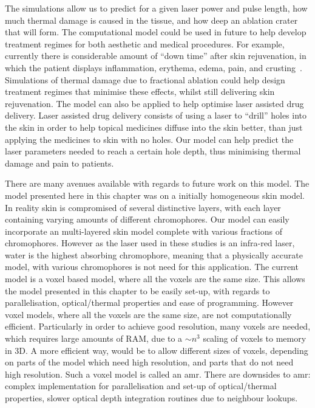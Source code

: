 The simulations allow us to predict for a given laser power and pulse length, how much thermal damage is caused in the tissue, and how deep an ablation crater that will form. The computational model could be used in future to help develop treatment regimes for both aesthetic and medical procedures. For example, currently there is considerable amount of ``down time'' after skin rejuvenation, in which the patient displays inflammation, erythema, edema, pain, and crusting~\cite{lapidoth2014fractional,trelles2011safe,kohl2015fractional}. Simulations of thermal damage due to fractional ablation could help design treatment regimes that minimise these effects, whilst still delivering skin rejuvenation.
The model can also be applied to help optimise laser assisted drug delivery. Laser assisted drug delivery consists of using a laser to ``drill'' holes into the skin in order to help topical medicines diffuse into the skin better, than just applying the medicines to skin with no holes. Our model can help predict the laser parameters needed to reach a certain hole depth, thus minimising thermal damage and pain to patients.

There are many avenues available with regards to future work on this model. The model presented here in this chapter was on a initially homogeneous skin model. In reality skin is compromised of several distinctive layers, with each layer containing varying amounts of different chromophores. Our model can easily incorporate an multi-layered skin model complete with various fractions of chromophores. However as the laser used in these studies is an infra-red laser, water is the highest absorbing chromophore, meaning that a physically accurate model, with various chromophores is not need for this application.
The current model is a voxel based model, where all the voxels are the same size. This allows the model presented in this chapter to be easily set-up, with regards to parallelisation, optical/thermal properties and ease of programming. However voxel models, where all the voxels are the same size, are not computationally efficient. Particularly in order to achieve good resolution, many voxels are needed, which requires large amounts of RAM, due to a $\sim n^3$ scaling of voxels to memory in 3D. A more efficient way, would be to allow different sizes of voxels, depending on parts of the model which need high resolution, and parts that do not need high resolution. Such a voxel model is called an \gls*{amr}. There are downsides to \gls*{amr}: complex implementation for parallelisation and set-up of optical/thermal properties, slower optical depth integration routines due to neighbour lookups.


